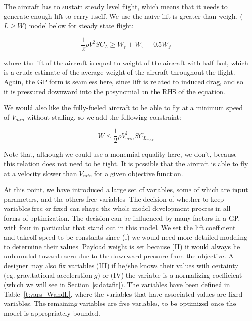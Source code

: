 The aircraft has to sustain steady level flight, which means
that it needs to generate enough lift to carry itself. We use the naive
lift is greater than weight ($L \geq W$)
model below for steady state flight:

\begin{equation}
   \frac{1}{2} \rho V^2 S C_L  \geq  W_p + W_w + 0.5 W_f
\end{equation}

where the lift of the aircraft is equal to weight of the aircraft with half-fuel, 
which is a crude estimate of the average weight of the aircraft throughout the flight.
Again, the \gls{GP} form is seamless here, since lift is related to
induced drag, and so it is pressured downward into the posynomial on the \gls{RHS} of the equation.

We would also like the fully-fueled aircraft to be able to fly at a minimum speed 
of $V_{min}$ without stalling, so we add the following constraint:

\begin{equation}
    W \leq \frac{1}{2} \rho V_{min}^2 S C_{L_{max}}
\end{equation}

Note that, although we could use a monomial equality here, we don't, because this
relation does not need to be tight. It is possible that the aircraft is able to
fly at a velocity slower than $V_{min}$ for a given objective function.

At this point, we have introduced a large set of variables, some of which are input
parameters, and the others free variables. The decision of whether to keep variables free or fixed
can shape the whole model development process in all forms of optimization.
The decision can be influenced by many
factors in a \gls{GP}, with four in particular that stand out in this model.
We set the lift coefficient and takeoff speed
to be constants since (I) we would need
more detailed modeling to determine their values. Payload weight is set
because (II) it would always be unbounded towards zero due to the downward pressure from
the objective. A designer may also fix variables (III) if he/she knows their values with
certainty (eg. gravitational acceleration $g$) or (IV) the variable is a normalizing
coefficient (which we will see in Section~\ref{s:datafit}).
The variables have been defined in Table~\ref{t:vars_WandL}, where the variables that
have associated values are fixed variables.
The remaining variables are free variables, to be optimized once the model
is appropriately bounded.

